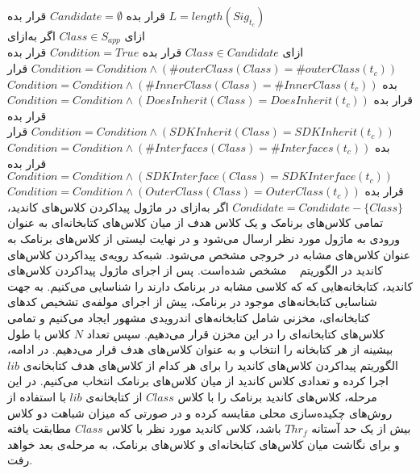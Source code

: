  قرار بده $Candidate = \emptyset$ 
 قرار بده $L= length(Sig_{t_c})$  \\
‌ازای $Class \in S_{app}$ 
‌اگر
‌به‌ازای\\
‌ازای $Class \in Candidate$ 
 قرار بده $Condition = True$
 قرار بده $Condition= Condition \wedge (\#outerClass(Class) = \#outerClass(t_c))$
 قرار بده $Condition= Condition \wedge (\#InnerClass(Class) = \#InnerClass(t_c))$
 قرار بده $Condition= Condition \wedge (DoesInherit(Class) = DoesInherit(t_c))$
 قرار بده $Condition= Condition \wedge (SDKInherit(Class) = SDKInherit(t_c))$
 قرار بده $Condition= Condition \wedge (\#Interfaces(Class) = \#Interfaces(t_c))$
 قرار بده $Condition= Condition \wedge (SDKInterface(Class) = SDKInterface(t_c))$
 قرار بده $Condition= Condition \wedge (OuterClass(Class) = OuterClass(t_c))$
$Condidate=Condidate - \{Class\}$
‌اگر
‌به‌ازای
در ماژول پیداکردن کلاس‌های کاندید، تمامی کلاس‌های برنامک و یک کلاس هدف از میان کلاس‌های کتابخانه‌ای به عنوان ورودی به ماژول مورد نظر ارسال می‌شود و در نهایت لیستی از کلاس‌های برنامک به عنوان کلاس‌های مشابه در خروجی مشخص می‌شود. شبه‌کد رویه‌ی پیداکردن کلاس‌های کاندید در الگوریتم ~ مشخص شده‌است. پس از اجرای ماژول پیدا‌کردن کلاس‌های کاندید،‌ کتابخانه‌هایی که که کلاسی مشابه در برنامک‌ دارند را شناسایی می‌کنیم. به جهت شناسایی کتابخانه‌‌های موجود در برنامک، پیش از اجرای مولفه‌ی تشخیص کد‌های کتابخانه‌ای، مخزنی شامل کتابخانه‌های اندرویدی مشهور ایجاد می‌کنیم و تمامی کلاس‌های کتابخانه‌ای را در این مخزن قرار می‌دهیم. سپس تعداد $N$ کلاس با طول بیشینه از هر کتابخانه‌ را انتخاب و به عنوان کلاس‌های هدف قرار می‌دهیم. در ادامه، الگوریتم پیدا‌کردن کلاس‌های کاندید را برای هر کدام از کلاس‌های هدف کتابخانه‌ی $lib$ اجرا کرده و تعدادی کلاس کاندید از میان کلاس‌های برنامک انتخاب می‌کنیم. در این مرحله، کلاس‌های کاندید برنامک را با کلاس $Class$ از کتابخانه‌ی $lib$ با استفاده از روش‌های چکیده‌سازی محلی مقایسه کرده و در صورتی که میزان شباهت دو کلاس بیش از یک حد آستانه $Thr_f$ باشد، کلاس کاندید مورد نظر با کلاس $Class$ مطابقت یافته و برای نگاشت میان کلاس‌های کتابخانه‌ای و کلاس‌های برنامک، به مرحله‌ی بعد خواهد رفت.

